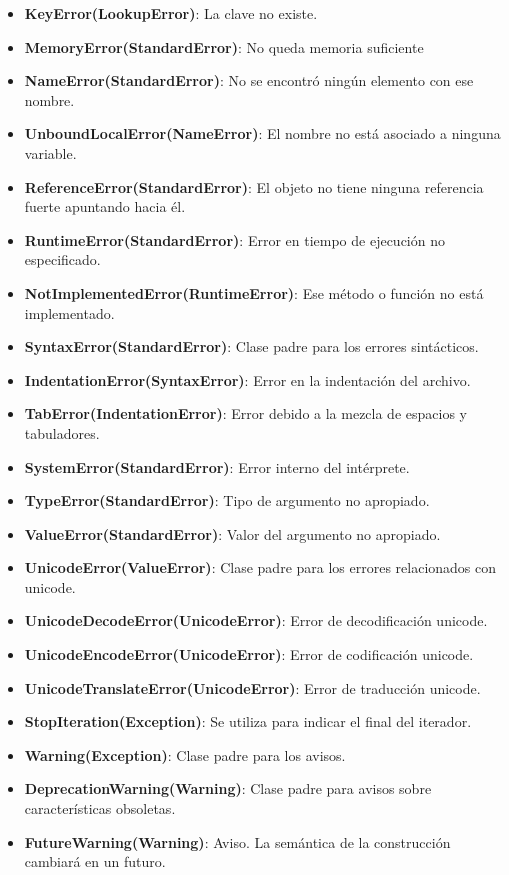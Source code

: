 \documentclass[12pt, twoside]{report}
\begin{document}
\begin{itemize}
	\item \textbf{KeyError(LookupError)}: La clave no existe.
	\item \textbf{MemoryError(StandardError)}: No queda memoria suficiente
	\item \textbf{NameError(StandardError)}: No se encontró ningún elemento con ese nombre.
	\item \textbf{UnboundLocalError(NameError)}: El nombre no está asociado a ninguna variable.
	\item \textbf{ReferenceError(StandardError)}: El objeto no tiene ninguna referencia fuerte apuntando hacia él.
	\item \textbf{RuntimeError(StandardError)}: Error en tiempo de ejecución no especificado.
	\item \textbf{NotImplementedError(RuntimeError)}: Ese método o función no está implementado.
	\item \textbf{SyntaxError(StandardError)}: Clase padre para los errores sintácticos.
	\item \textbf{IndentationError(SyntaxError)}: Error en la indentación del archivo.
	\item \textbf{TabError(IndentationError)}: Error debido a la mezcla de espacios y tabuladores.
	\item \textbf{SystemError(StandardError)}: Error interno del intérprete.
	\item \textbf{TypeError(StandardError)}: Tipo de argumento no apropiado.
	\item \textbf{ValueError(StandardError)}: Valor del argumento no apropiado.
	\item \textbf{UnicodeError(ValueError)}: Clase padre para los errores relacionados con unicode.
	\item \textbf{UnicodeDecodeError(UnicodeError)}: Error de decodificación unicode.
	\item \textbf{UnicodeEncodeError(UnicodeError)}: Error de codificación unicode.
	\item \textbf{UnicodeTranslateError(UnicodeError)}: Error de traducción unicode.
	\item \textbf{StopIteration(Exception)}: Se utiliza para indicar el final del iterador.
	\item \textbf{Warning(Exception)}: Clase padre para los avisos.
	\item \textbf{DeprecationWarning(Warning)}: Clase padre para avisos sobre características obsoletas.
	\item \textbf{FutureWarning(Warning)}: Aviso. La semántica de la construcción cambiará en un futuro.

\end{itemize}
\end{document}
